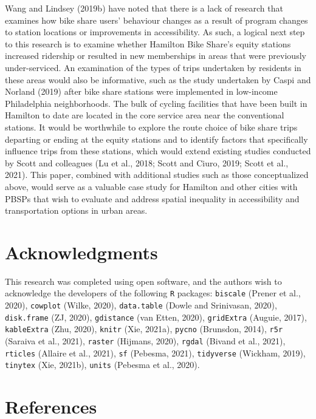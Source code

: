 \documentclass[]{elsarticle} %
\begin{document}
Wang and Lindsey (2019b) have noted that there is a lack of research
that examines how bike share users' behaviour changes as a result of
program changes to station locations or improvements in accessibility.
As such, a logical next step to this research is to examine whether
Hamilton Bike Share's equity stations increased ridership or resulted in
new memberships in areas that were previously under-serviced. An
examination of the types of trips undertaken by residents in these areas
would also be informative, such as the study undertaken by Caspi and
Norland (2019) after bike share stations were implemented in low-income
Philadelphia neighborhoods. The bulk of cycling facilities that have
been built in Hamilton to date are located in the core service area near
the conventional stations. It would be worthwhile to explore the route
choice of bike share trips departing or ending at the equity stations
and to identify factors that specifically influence trips from these
stations, which would extend existing studies conducted by Scott and
colleagues (Lu et al., 2018; Scott and Ciuro, 2019; Scott et al., 2021).
This paper, combined with additional studies such as those
conceptualized above, would serve as a valuable case study for Hamilton
and other cities with PBSPs that wish to evaluate and address spatial
inequality in accessibility and transportation options in urban areas.

\hypertarget{acknowledgments}{%
\section{Acknowledgments}\label{acknowledgments}}

This research was completed using open software, and the authors wish to
acknowledge the developers of the following \texttt{R} packages:
\texttt{biscale} (Prener et al., 2020), \texttt{cowplot} (Wilke, 2020),
\texttt{data.table} (Dowle and Srinivasan, 2020), \texttt{disk.frame}
(ZJ, 2020), \texttt{gdistance} (van Etten, 2020), \texttt{gridExtra}
(Auguie, 2017), \texttt{kableExtra} (Zhu, 2020), \texttt{knitr} (Xie,
2021a), \texttt{pycno} (Brunsdon, 2014), \texttt{r5r} (Saraiva et al.,
2021), \texttt{raster} (Hijmans, 2020), \texttt{rgdal} (Bivand et al.,
2021), \texttt{rticles} (Allaire et al., 2021), \texttt{sf} (Pebesma,
2021), \texttt{tidyverse} (Wickham, 2019), \texttt{tinytex} (Xie,
2021b), \texttt{units} (Pebesma et al., 2020).

\hypertarget{references}{%
\section*{References}\label{references}}
\end{document}
